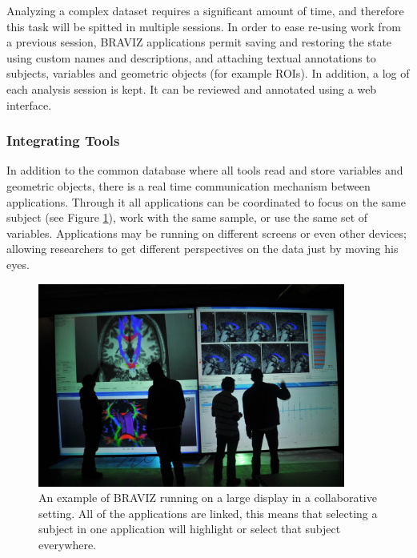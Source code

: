 \documentclass[twocolumn]{svjour3} %
\begin{document}
Analyzing a complex dataset requires a significant amount of time, and therefore this task will be spitted in multiple sessions. In order to ease re-using work from a previous session, BRAVIZ applications permit saving and restoring the state using custom names and descriptions, and attaching textual annotations to subjects, variables and geometric objects (for example ROIs). In addition, a log of each analysis session is kept. It can be reviewed and annotated using a web interface.

\subsubsection{Integrating Tools}

In addition to the common database where all tools read and store variables and geometric objects, there is a real time communication mechanism between applications. Through it all applications can be coordinated to focus on the same subject (see Figure \ref{fig_imagine}), work with the same sample, or use the same set of variables. Applications may be running on different screens or even other devices; allowing researchers to get different perspectives on the data just by moving his eyes.

\begin{figure}
\begin{center}
\includegraphics[width=0.9\textwidth]{figures/imagine.jpg}
\end{center}
 \caption{\label{fig_imagine} An example of BRAVIZ running on a large display in a collaborative setting. All of the applications are linked, this means that selecting a subject in one application will highlight or select that subject everywhere.}
\end{figure}
\end{document}
